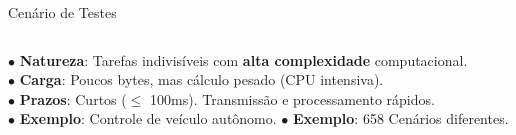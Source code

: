 \documentclass{beamer}
\begin{document}
\begin{frame}{Cenário de Testes}
    \begin{columns}[T]
        \begin{column}{0.34\textwidth}
            \vspace{0.1cm}
            \begin{tcolorbox}[colback=blue!5, colframe=blue!80!black, title=Perfil da Aplicação, fonttitle=\bfseries\tiny, arc=0pt, outer arc=0pt, leftrule=2pt, rightrule=0.2pt, toprule=0.1pt, bottomrule=0.2pt, boxsep=1pt, left=2pt, right=2pt, top=2pt, bottom=2pt]
                \tiny
                $\bullet$ \textbf{Natureza}: Tarefas indivisíveis com \textbf{alta complexidade} computacional.\\
                $\bullet$ \textbf{Carga}: Poucos bytes, mas cálculo pesado (CPU intensiva).\\
                $\bullet$ \textbf{Prazos}: Curtos ($\le$ 100ms). Transmissão e processamento rápidos.\\
                $\bullet$ \textbf{Exemplo}: Controle de veículo autônomo.
                $\bullet$ \textbf{Exemplo}: 658 Cenários diferentes.
            \end{tcolorbox}
        \end{column}
        

\end{columns}
\end{frame}
\end{document}
